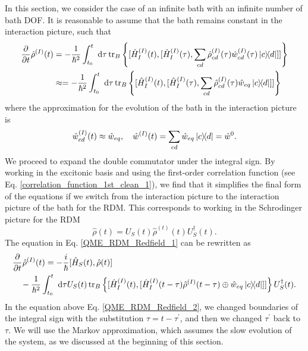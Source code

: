 In this section, we consider the case of an infinite bath with an infinite number of bath DOF. It is reasonable to assume that the bath remains constant in the interaction picture, such that
\begin{equation}
\label{QME_RDM_Redfield_1}
\begin{aligned}
    \frac{\partial}{\partial t}\hat{\rho}^{(I)}(t) &= -\frac{1}{\hbar^2} \int_{t_0}^{t} \mathrm{~d} \tau \operatorname{tr}_B \left\{[ \hat{H}_I^{(I)}(t), [ \hat{H}_I^{(I)}(\tau), \sum_{cd} \hat{\rho}_{cd}^{(I)}(\tau) \hat{w}_{cd}^{(I)}(\tau) \ketbra{c}{d} ] ] \right\} \\
    &\approx= -\frac{1}{\hbar^2} \int_{t_0}^{t} \mathrm{~d} \tau \operatorname{tr}_B \left\{[ \hat{H}_I^{(I)}(t), [ \hat{H}_I^{(I)}(\tau), \sum_{cd} \hat{\rho}_{cd}^{(I)}(\tau) \hat{w}_{eq} \ketbra{c}{d}] ] \right\}
    \end{aligned}
\end{equation}
where the approximation for the evolution of the bath in the interaction picture is
\begin{equation}
    \hat{w}_{cd}^{(I)}(t) \approx \hat{w}_{eq}, \quad \hat{w}^{(I)}(t) =\sum_{cd}\hat{w}_{eq} \ketbra{c}{d} = \hat{w}^{0}.
\end{equation}
We proceed to expand the double commutator under the integral sign. By working in the excitonic basis and using the first-order correlation function (see Eq. \ref{correlation_function_1st_clean_1}), we find that it simplifies the final form of the equations if we switch from the interaction picture to the interaction picture of the bath for the RDM. This corresponds to working in the Schrodinger picture for the RDM
\begin{equation}
    \hat{\rho}(t)=U_{S}(t) \hat{\rho}^{(t)}(t) U_{S}^\dagger(t).
\end{equation}
The equation in Eq. \ref{QME_RDM_Redfield_1} can be rewritten as
\begin{equation}
\label{QME_RDM_Redfield_2}
\begin{aligned}
    &\frac{\partial}{\partial t}\hat{\rho}^{(I)}(t) = -\frac{i}{\hbar} [ \hat{H}_S(t), \hat{\rho}(t) ] \\
    &\quad -\frac{1}{\hbar^2} \int_{t_0}^{t} \mathrm{~d} \tau U_{S}(t) \operatorname{tr}_B \left\{[ \hat{H}_I^{(I)}(t), [ \hat{H}_I^{(I)}(t-\tau) \hat{\rho}^{(I)}(t-\tau) \oplus \hat{w}_{eq} \ketbra{c}{d}] ] \right\} U_{S}^\dagger(t).
    \end{aligned}
\end{equation}
In the equation above Eq. \ref{QME_RDM_Redfield_2}, we changed boundaries of the integral sign with the substitution $\tau = t - \tau^\prime$, and then we changed $\tau^\prime$ back to $\tau$. We will use the Markov approximation, which assumes the slow evolution of the system, as we discussed at the beginning of this section.
